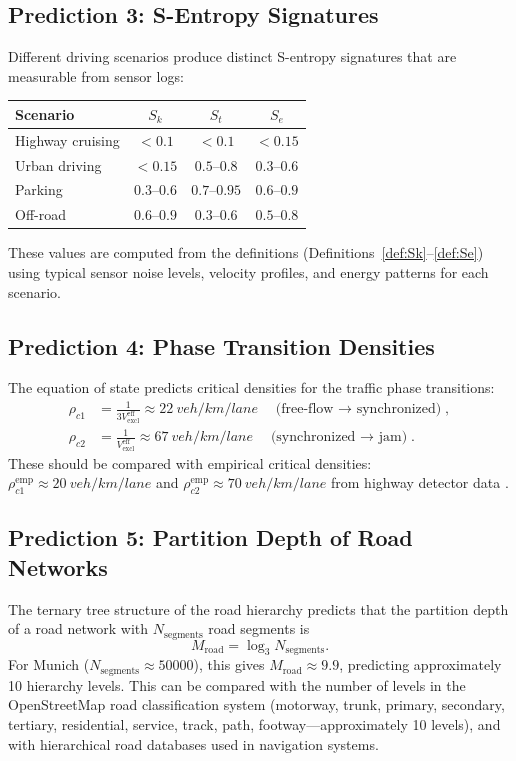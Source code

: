 \documentclass[twocolumn,10pt]{article}
\newcommand{\Sk}{S_k}
\newcommand{\St}{S_t}
\newcommand{\Se}{S_e}
\newcommand{\Vexcl}{V_{\mathrm{excl}}}
\begin{document}
\subsection{Prediction 3: S-Entropy Signatures}

Different driving scenarios produce distinct S-entropy signatures that are measurable from sensor logs:
\begin{center}
\begin{tabular}{lccc}
\toprule
\textbf{Scenario} & $\Sk$ & $\St$ & $\Se$ \\
\midrule
Highway cruising & $< 0.1$ & $< 0.1$ & $< 0.15$ \\
Urban driving & $< 0.15$ & $0.5$--$0.8$ & $0.3$--$0.6$ \\
Parking & $0.3$--$0.6$ & $0.7$--$0.95$ & $0.6$--$0.9$ \\
Off-road & $0.6$--$0.9$ & $0.3$--$0.6$ & $0.5$--$0.8$ \\
\bottomrule
\end{tabular}
\end{center}
These values are computed from the definitions (Definitions~\ref{def:Sk}--\ref{def:Se}) using typical sensor noise levels, velocity profiles, and energy patterns for each scenario.

\subsection{Prediction 4: Phase Transition Densities}

The equation of state predicts critical densities for the traffic phase transitions:
\begin{align}
\rho_{c1} &= \frac{1}{3\Vexcl^{\mathrm{eff}}} \approx \SI{22}{veh/km/lane} \quad \text{(free-flow $\to$ synchronized)}, \\
\rho_{c2} &= \frac{1}{\Vexcl^{\mathrm{eff}}} \approx \SI{67}{veh/km/lane} \quad \text{(synchronized $\to$ jam)}.
\end{align}
These should be compared with empirical critical densities: $\rho_{c1}^{\mathrm{emp}} \approx \SI{20}{veh/km/lane}$ and $\rho_{c2}^{\mathrm{emp}} \approx \SI{70}{veh/km/lane}$ from highway detector data \cite{kerner1993, helbing2001}.

\subsection{Prediction 5: Partition Depth of Road Networks}

The ternary tree structure of the road hierarchy predicts that the partition depth of a road network with $N_{\mathrm{segments}}$ road segments is
\begin{equation}
M_{\mathrm{road}} = \log_3 N_{\mathrm{segments}}.
\end{equation}
For Munich ($N_{\mathrm{segments}} \approx 50000$), this gives $M_{\mathrm{road}} \approx 9.9$, predicting approximately 10 hierarchy levels. This can be compared with the number of levels in the OpenStreetMap road classification system (motorway, trunk, primary, secondary, tertiary, residential, service, track, path, footway---approximately 10 levels), and with hierarchical road databases used in navigation systems.
\end{document}
